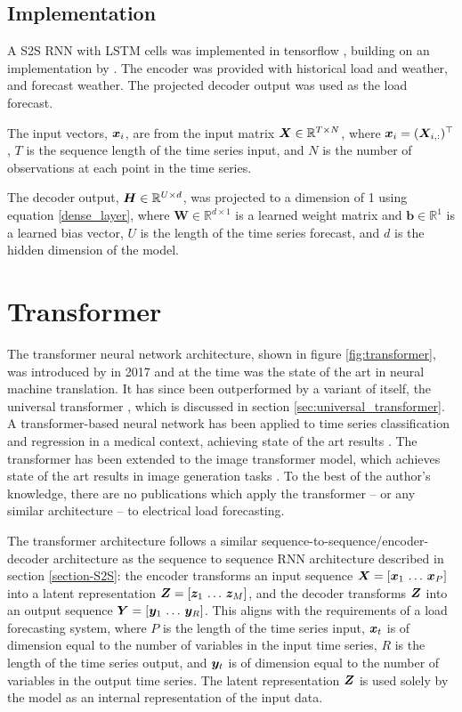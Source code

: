 \subsection{Implementation}
A S2S RNN with LSTM cells was implemented in tensorflow \cite{tensorflow2015-whitepaper}, building on an implementation by \citet{Chevalier2017}.
The encoder was provided with historical load and weather, and forecast weather.
The projected decoder output was used as the load forecast.

The input vectors, ${\bm{x}}_i$, are from the input matrix ${\bm{X}} \in \mathbb{R}^{T \times N}$, where ${\bm{x}}_i = ({\bm{X}}_{i,:})^\top$, $T$ is the sequence length of the time series input, and $N$ is the number of observations at each point in the time series.

The decoder output, ${\bm{H}} \in \mathbb{R}^{U \times d}$, was projected to a dimension of 1 using equation \ref{dense_layer}, where $\boldsymbol{W} \in \mathbb{R}^{d \times 1}$ is a learned weight matrix and $\boldsymbol{b} \in \mathbb{R}^{1}$ is a learned bias vector, $U$ is the length of the time series forecast, and $d$ is the hidden dimension of the model.

\section{Transformer} \label{sec:transformer}
The transformer neural network architecture, shown in figure \ref{fig:transformer}, was introduced by \citet{Vaswani2017} in 2017 and at the time was the state of the art in neural machine translation.
It has since been outperformed by a variant of itself, the universal transformer \cite{Dehghani2018}, which is discussed in section \ref{sec:universal_transformer}.
A transformer-based neural network has been applied to time series classification and regression in a medical context, achieving state of the art results \cite{Song2017}.
The transformer has been extended to the image transformer model, which achieves state of the art results in image generation tasks \cite{Parmar2018}.
To the best of the author's knowledge, there are no publications which apply the transformer -- or any similar architecture -- to electrical load forecasting.

The transformer architecture follows a similar sequence-to-sequence/encoder-decoder architecture as the sequence to sequence RNN architecture described in section \ref{section-S2S}: the encoder transforms an input sequence ${\bm{X}} = [{\bm{x}}_1 \, \ldots \, {\bm{x}}_P]$ into a latent representation ${\bm{Z}} = [{\bm{z}}_1 \, \ldots \, {\bm{z}}_M]$, and the decoder transforms ${\bm{Z}}$ into an output sequence ${\bm{Y}} = [{\bm{y}}_1 \, \ldots \, {\bm{y}}_R]$.
This aligns with the requirements of a load forecasting system, where $P$ is the length of the time series input, ${\bm{x}}_t$ is of dimension equal to the number of variables in the input time series, $R$ is the length of the time series output, and ${\bm{y}}_t$ is of dimension equal to the number of variables in the output time series.
The latent representation ${\bm{Z}}$ is used solely by the model as an internal representation of the input data.

